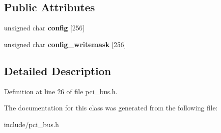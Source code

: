 \subsection*{Public Attributes}
\begin{DoxyCompactItemize}
\item 
\hypertarget{classPCI__Device_a96714f926af98bbc3ae6030b918e4371}{unsigned char {\bfseries config} \mbox{[}256\mbox{]}}\label{classPCI__Device_a96714f926af98bbc3ae6030b918e4371}

\item 
\hypertarget{classPCI__Device_a0dc5ffb8e062148eb946488cfdf9b2fc}{unsigned char {\bfseries config\-\_\-writemask} \mbox{[}256\mbox{]}}\label{classPCI__Device_a0dc5ffb8e062148eb946488cfdf9b2fc}

\end{DoxyCompactItemize}


\subsection{Detailed Description}


Definition at line 26 of file pci\-\_\-bus.\-h.



The documentation for this class was generated from the following file\-:\begin{DoxyCompactItemize}
\item 
include/pci\-\_\-bus.\-h\end{DoxyCompactItemize}
